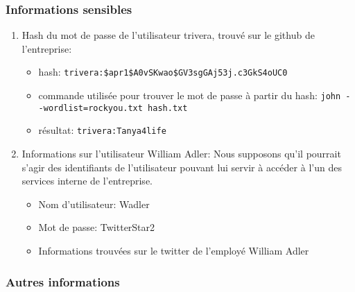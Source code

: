 \documentclass[french,oneside]{article}
\begin{document}
\subsubsection{Informations sensibles}

\begin{enumerate}
    \item Hash du mot de passe de l'utilisateur trivera, trouvé sur le github de l'entreprise:
    \begin{itemize}
        \item hash: \texttt{trivera{}:\$apr1\$A0vSKwao\$GV3sgGAj53j.c3GkS4oUC0}
        \item commande utilisée pour trouver le mot de passe à partir du hash: \texttt{john -{}-wordlist=rockyou.txt hash.txt}
        \item résultat: \texttt{trivera{}:Tanya4life}
    \end{itemize}
    
    \item Informations sur l'utilisateur William Adler:
    Nous supposons qu'il pourrait s'agir des identifiants de l'utilisateur pouvant lui servir à accéder à l'un des services interne de l'entreprise.
    \begin{itemize}
        \item Nom d'utilisateur: Wadler
        \item Mot de passe: TwitterStar2
        \item Informations trouvées sur le twitter de l'employé William Adler
    \end{itemize}
\end{enumerate}



\subsubsection{Autres informations}
\end{document}

